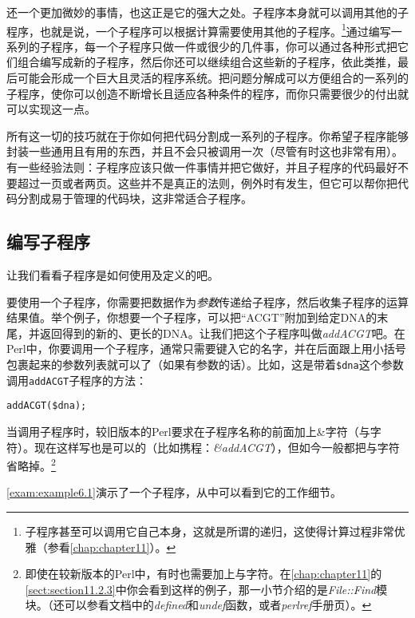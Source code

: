 还一个更加微妙的事情，也这正是它的强大之处。子程序本身就可以调用其他的子程序，也就是说，一个子程序可以根据计算需要使用其他的子程序。\footnote{子程序甚至可以调用它自己本身，这就是所谓的递归，这使得计算过程非常优雅（参看\autoref{chap:chapter11}）。}通过编写一系列的子程序，每一个子程序只做一件或很少的几件事，你可以通过各种形式把它们组合编写成新的子程序，然后你还可以继续组合这些新的子程序，依此类推，最后可能会形成一个巨大且灵活的程序系统。把问题分解成可以方便组合的一系列的子程序，使你可以创造不断增长且适应各种条件的程序，而你只需要很少的付出就可以实现这一点。

所有这一切的技巧就在于你如何把代码分割成一系列的子程序。你希望子程序能够封装一些通用且有用的东西，并且不会只被调用一次（尽管有时这也非常有用）。有一些经验法则：子程序应该只做一件事情并把它做好，并且子程序的代码最好不要超过一页或者两页。这些并不是真正的法则，例外时有发生，但它可以帮你把代码分割成易于管理的代码块，这非常适合子程序。

\subsection{编写子程序}
让我们看看子程序是如何使用及定义的吧。

要使用一个子程序，你需要把数据作为\textit{参数}传递给子程序，然后收集子程序的运算结果值。举个例子，你想要一个子程序，可以把“ACGT”附加到给定DNA的末尾，并返回得到的新的、更长的DNA。让我们把这个子程序叫做\textit{addACGT}吧。在Perl中，你要调用一个子程序，通常只需要键入它的名字，并在后面跟上用小括号包裹起来的参数列表就可以了（如果有参数的话）。比如，这是带着\verb|$dna|这个参数调用\verb|addACGT|子程序的方法：

\begin{lstlisting}
addACGT($dna);
\end{lstlisting}

当调用子程序时，较旧版本的Perl要求在子程序名称的前面加上\&字符（与字符）。现在这样写也是可以的（比如携程：\textit{\&addACGT}），但如今一般都把与字符省略掉。\footnote{即使在较新版本的Perl中，有时也需要加上与字符。在\autoref{chap:chapter11}的\autoref{sect:section11.2.3}中你会看到这样的例子，那一小节介绍的是\textit{File::Find}模块。（还可以参看文档中的\textit{defined}和\textit{undef}函数，或者\textit{perlref}手册页）。}

\autoref{exam:example6.1}演示了一个子程序，从中可以看到它的工作细节。




